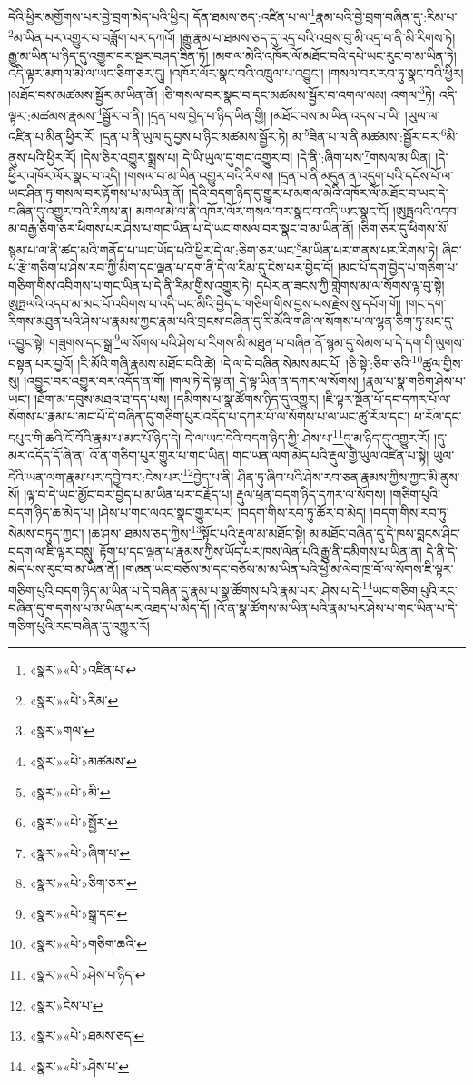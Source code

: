 དེའི་ཕྱིར་མགྱོགས་པར་བྱེ་བྲག་མེད་པའི་ཕྱིར། དོན་ཐམས་ཅད་:འཛིན་པ་ལ་\footnote{«སྣར་»«པེ་»འཛིན་པ་}རྣམ་པའི་བྱེ་བྲག་བཞིན་དུ་:རིམ་པ་\footnote{«སྣར་»«པེ་»རིམ་}མ་ཡིན་པར་འགྱུར་བ་བཟློག་པར་དཀའོ། །རྒྱུ་རྣམ་པ་ཐམས་ཅད་དུ་འདྲ་བའི་འབྲས་བུ་མི་འདྲ་བ་ནི་མི་རིགས་ཏེ། རྒྱུ་མ་ཡིན་པ་ཉིད་དུ་འགྱུར་བར་སྔར་བཤད་ཟིན་ཏོ། །མགལ་མེའི་འཁོར་ལོ་མཐོང་བའི་དཔེ་ཡང་རུང་བ་མ་ཡིན་ཏེ། འདི་ལྟར་མགལ་མེ་ལ་ཡང་ཅིག་ཅར་དུ། །འཁོར་ལོར་སྣང་བའི་འཁྲུལ་པ་འབྱུང་། །གསལ་བར་རབ་ཏུ་སྣང་བའི་ཕྱིར། །མཐོང་བས་མཚམས་སྦྱོར་མ་ཡིན་ནོ། །ཅི་གསལ་བར་སྣང་བ་དང་མཚམས་སྦྱོར་བ་འགལ་ལམ། འགལ་\footnote{«སྣར་»གལ་}ཏེ། འདི་ལྟར་:མཚམས་རྣམས་\footnote{«སྣར་»«པེ་»མཚམས་}སྦྱོར་བ་ནི། །དྲན་པས་བྱེད་པ་ཉིད་ཡིན་གྱི། །མཐོང་བས་མ་ཡིན་འདས་པ་ཡི། །ཡུལ་ལ་འཛིན་པ་མིན་ཕྱིར་རོ། །དྲན་པ་ནི་ཡུལ་དུ་བྱས་པ་ཉིང་མཚམས་སྦྱོར་ཏེ། མ་\footnote{«སྣར་»«པེ་»མི་}ཟིན་པ་ལ་ནི་མཚམས་:སྦྱོར་བར་\footnote{«སྣར་»«པེ་»སྦྱོར་}མི་ནུས་པའི་ཕྱིར་རོ། །དེས་ཅིར་འགྱུར་སྨྲས་པ། དེ་ཡི་ཡུལ་དུ་གང་འགྱུར་བ། །དེ་ནི་:ཞིག་པས་\footnote{«སྣར་»«པེ་»ཞིག་པ་}གསལ་མ་ཡིན། །དེ་ཕྱིར་འཁོར་ལོར་སྣང་བ་འདི། །གསལ་བ་མ་ཡིན་འགྱུར་བའི་རིགས། །དྲན་པ་ནི་མདུན་ན་འདུག་པའི་དངོས་པོ་ལ་ཡང་ཤིན་ཏུ་གསལ་བར་རྟོགས་པ་མ་ཡིན་ནོ། །དེའི་བདག་ཉིད་དུ་གྱུར་པ་མགལ་མེའི་འཁོར་ལོ་མཐོང་བ་ཡང་དེ་བཞིན་དུ་འགྱུར་བའི་རིགས་ན། མགལ་མེ་ལ་ནི་འཁོར་ལོར་གསལ་བར་སྣང་བ་འདི་ཡང་སྣང་ངོ། །ཨུཏྤལའི་འདབ་མ་བརྒྱ་ཅིག་ཅར་ཕིགས་པར་ཤེས་པ་གང་ཡིན་པ་དེ་ཡང་གསལ་བར་སྣང་བ་མ་ཡིན་ནོ། །ཅིག་ཅར་དུ་ཕིགས་སོ་སྙམ་པ་ལ་ནི་ཚད་མའི་གནོད་པ་ཡང་ཡོད་པའི་ཕྱིར་དེ་ལ་:ཅིག་ཅར་ཡང་\footnote{«སྣར་»«པེ་»ཅིག་ཅར་}མ་ཡིན་པར་གནས་པར་རིགས་ཏེ། ཞིབ་པ་རྩེ་གཅིག་པ་ཤེས་རབ་ཀྱི་མིག་དང་ལྡན་པ་དག་ནི་དེ་ལ་རིམ་དུ་ངེས་པར་བྱེད་དོ། །མང་པོ་དག་བྱེད་པ་གཅིག་པ་གཅིག་གིས་འབིགས་པ་གང་ཡིན་པ་དེ་ནི་རིམ་གྱིས་འགྱུར་ཏེ། དཔེར་ན་ཟངས་ཀྱི་གླེགས་མ་ལ་སོགས་ལྟ་བུ་སྟེ། ཨུཏྤལའི་འདབ་མ་མང་པོ་འབིགས་པ་འདི་ཡང་མིའི་བྱེད་པ་གཅིག་གིས་བྱས་པས་རྗེས་སུ་དཔོག་གོ། །གང་དག་རིགས་མཐུན་པའི་ཤེས་པ་རྣམས་ཀྱང་རྣམ་པའི་གྲངས་བཞིན་དུ་རི་མོའི་གཞི་ལ་སོགས་པ་ལ་ལྷན་ཅིག་ཏུ་མང་དུ་འབྱུང་སྟེ། གཟུགས་དང་སྒྲ་\footnote{«སྣར་»«པེ་»སྒྲ་དང་}ལ་སོགས་པའི་ཤེས་པ་རིགས་མི་མཐུན་པ་བཞིན་ནོ་སྙམ་དུ་སེམས་པ་དེ་དག་གི་ལུགས་བསྟན་པར་བྱའོ། །རི་མོའི་གཞི་རྣམས་མཐོང་བའི་ཚེ། །དེ་ལ་དེ་བཞིན་སེམས་མང་པོ། །ཅི་སྟེ་:ཅིག་ཅའི་\footnote{«སྣར་»«པེ་»གཅིག་ཆའི་}ཚུལ་གྱིས་སུ། །འབྱུང་བར་འགྱུར་བར་འདོད་ན་གོ། །གལ་ཏེ་དེ་ལྟ་ན། དེ་ལྟ་ཡིན་ན་དཀར་ལ་སོགས། །རྣམ་པ་སྣ་གཅིག་ཤེས་པ་ཡང་། །ཐོག་མ་དབུས་མཐའ་ཐ་དད་པས། །དམིགས་པ་སྣ་ཚོགས་ཉིད་དུ་འགྱུར། །ཇི་ལྟར་སྔོན་པོ་དང་དཀར་པོ་ལ་སོགས་པ་རྣམ་པ་མང་པོ་དེ་བཞིན་དུ་གཅིག་པུར་འདོད་པ་དཀར་པོ་ལ་སོགས་པ་ལ་ཡང་ཚུ་རོལ་དང་། ཕ་རོལ་དང་དཔུང་གི་ཆའི་ངོ་བོའི་རྣམ་པ་མང་པོ་ཉིད་དེ། དེ་ལ་ཡང་དེའི་བདག་ཉིད་ཀྱི་:ཤེས་པ་\footnote{«སྣར་»«པེ་»ཤེས་པ་ཉིད་}དུ་མ་ཉིད་དུ་འགྱུར་རོ། །དུ་མར་འདོད་དོ་ཞེ་ན། འོ་ན་གཅིག་པུར་གྱུར་པ་གང་ཡིན། གང་ཡན་ལག་མེད་པའི་རྡུལ་གྱི་ཡུལ་འཛིན་པ་སྟེ། ཡུལ་དེའི་ཡན་ལག་རྣམ་པར་དབྱེ་བར་:ངེས་པར་\footnote{«སྣར་»ངེས་པ་}བྱེད་པ་ནི། ཤིན་ཏུ་ཞིབ་པའི་ཤེས་རབ་ཅན་རྣམས་ཀྱིས་ཀྱང་མི་ནུས་སོ། །ལྟ་བ་དེ་ཡང་མྱོང་བར་བྱེད་པ་མ་ཡིན་པར་བརྗོད་པ། རྡུལ་ཕྲན་བདག་ཉིད་དཀར་ལ་སོགས། །གཅིག་པུའི་བདག་ཉིད་ཆ་མེད་པ། །ཤེས་པ་གང་ལའང་སྣང་གྱུར་པར། །བདག་གིས་རབ་ཏུ་ཚོར་བ་མེད། །བདག་གིས་རབ་ཏུ་སེམས་བཏུད་ཀྱང་། །ཆ་ཤས་:ཐམས་ཅད་ཀྱིས་\footnote{«སྣར་»«པེ་»ཐམས་ཅད་}སྟོང་པའི་རྡུལ་མ་མཐོང་སྟེ། མ་མཐོང་བཞིན་དུ་དེ་ཁས་བླངས་ཤིང་བདག་ལ་ཇི་ལྟར་བསླུ། རྟོག་པ་དང་ལྡན་པ་རྣམས་ཀྱིས་ཡོད་པར་ཁས་ལེན་པའི་རྒྱུ་ནི་དམིགས་པ་ཡིན་ན། དེ་ནི་དེ་མེད་པས་རུང་བ་མ་ཡིན་ནོ། །གཞན་ཡང་བཅོས་མ་དང་བཅོས་མ་མ་ཡིན་པའི་ཕྱེ་མ་ལེབ་ཁྲ་བོ་ལ་སོགས་ཇི་ལྟར་གཅིག་པུའི་བདག་ཉིད་མ་ཡིན་པ་དེ་བཞིན་དུ་རྣམ་པ་སྣ་ཚོགས་པའི་རྣམ་པར་:ཤེས་པ་དེ་\footnote{«སྣར་»«པེ་»ཤེས་པ་}ཡང་གཅིག་པུའི་རང་བཞིན་དུ་གདགས་པ་མ་ཡིན་པར་འཐད་པ་མེད་དོ། །འོ་ན་སྣ་ཚོགས་མ་ཡིན་པའི་རྣམ་པར་ཤེས་པ་གང་ཡིན་པ་དེ་གཅིག་པུའི་རང་བཞིན་དུ་འགྱུར་རོ། 